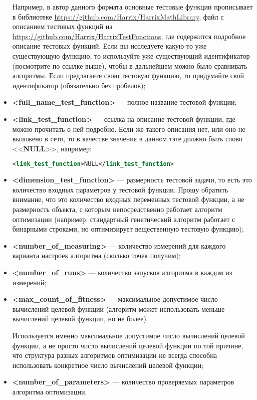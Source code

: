 \documentclass[a4paper,12pt]{article}
\begin{document}
\begin{itemize}
Например, в автор данного формата основные тестовые функции прописывает в библиотеке \href {https://github.com/Harrix/HarrixMathLibrary} {https://github.com/Harrix/HarrixMathLibrary}, файл с описанием тестовых функций на \href {https://github.com/Harrix/HarrixTestFunctions} {https://github.com/Harrix/HarrixTestFunctions}, где содержится подробное описание тестовых функций. Если вы исследуете какую-то уже существующую функцию, то используйте уже существующий идентификатор (посмотрите по ссылке выше), чтобы в дальнейшем можно было сравнивать алгоритмы. Если предлагаете свою тестовую функцию, то придумайте свой идентификатор (обязательно без пробелов);
\item \textbf{<full\_name\_test\_function>} --- полное название тестовой функции;
\item \textbf{<link\_test\_function>} --- ссылка на описание тестовой функции, где можно прочитать о ней подробно. Если же такого описания нет, или оно не выложено в сети, то в качестве значения в данном тэге должно быть слово <<\textbf{NULL}>>, например:
\begin{lstlisting}[label=Part09, language=xml ,caption=У алгоритма нет ссылки в файле Harrix Optimization Testing]
<link_test_function>NULL</link_test_function>
\end{lstlisting}
\item \textbf{<dimension\_test\_function>} --- размерность тестовой задачи, то есть это количество входных параметров у тестовой функции. Прошу обратить внимание, что это количество входных переменных тестовой функции, а не размерность объекта, с которым непосредственно работает алгоритм оптимизации (например, стандартный генетический алгоритм работает с бинарными строками, но оптимизирует вещественную тестовую функцию);
\item \textbf{<number\_of\_measuring>} --- количество измерений для каждого варианта настроек алгоритма (сколько точек получим);
\item \textbf{<number\_of\_runs>} --- количество запусков алгоритма в каждом из измерений;
\item \textbf{<max\_count\_of\_fitness>} --- максимальное допустимое число вычислений целевой функции (алгоритм может использовать меньше вычислений целевой функции, но не более).

Используется именно максимальное допустимое число вычислений целевой функции, а не просто число вычислений целевой функции по той причине, что структура разных алгоритмов оптимизации не всегда способна использовать конкретное число вычислений целевой функции;
\item \textbf{<number\_of\_parameters>} --- количество проверяемых параметров алгоритма оптимизации.


\end{itemize}
\end{document}
